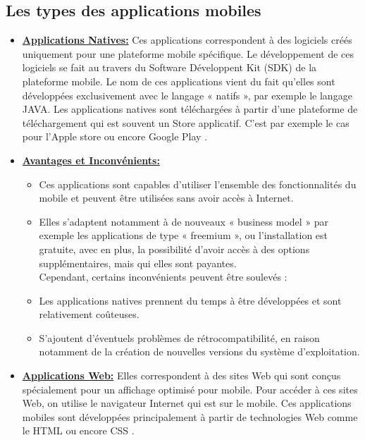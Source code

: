 \documentclass[french,a4,12pt]{report}
\begin{document}
\begin{tcolorbox}[colframe=green!75,rightrule=0.5cm,leftrule=0.5cm,]
\subsection { Les types des applications mobiles}
\end{tcolorbox}
\begin{itemize}%
	\item{ \underline{ \textbf{Applications Natives:}}}
	\quad \textsf{ Ces applications correspondent à des logiciels créés uniquement pour une plateforme mobile spécifique. Le développement de ces logiciels se fait au travers du Software Développent Kit (SDK) de la plateforme mobile. Le nom de ces applications vient du fait qu'elles sont développées exclusivement avec le langage « natifs », par exemple le langage JAVA. Les applications natives sont téléchargées à partir d'une plateforme de téléchargement qui est souvent un Store applicatif. C'est par exemple le cas pour l'Apple store ou encore Google Play} \cite{2}.\\
	\item{ \underline{ \textbf{Avantages et Inconvénients:}}}
	\begin{itemize}%
		\item Ces applications sont capables d'utiliser l'ensemble des fonctionnalités du mobile et peuvent être utilisées sans avoir accès à Internet.
		\item  Elles s'adaptent notamment à de nouveaux « business model » par exemple les applications de type « freemium », ou l'installation est gratuite, avec en plus, la possibilité d'avoir accès à des options supplémentaires, mais qui elles sont payantes.\\
		Cependant, certains inconvénients peuvent être soulevés :
		\item  Les applications natives prennent du temps à être développées et sont relativement coûteuses.
		\item  S'ajoutent d'éventuels problèmes de rétrocompatibilité, en raison notamment de la création de nouvelles versions du système d'exploitation.
	\end{itemize}
	\item{ \underline{ \textbf{Applications Web:}}}
	\textsf{Elles correspondent à des sites Web qui sont conçus spécialement pour un affichage optimisé pour mobile. Pour accéder à ces sites Web, on utilise le navigateur Internet qui est sur le mobile. Ces applications mobiles sont développées principalement à partir de technologies Web comme le HTML ou encore CSS \cite{2}.}\\ 

\end{itemize}
\end{document}
